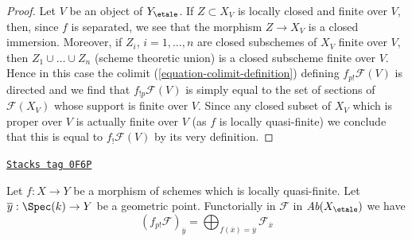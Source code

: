 \begin{proof}
Let $V$ be an object of $Y_\etale$. If $Z \subset X_V$ is locally closed
and finite over $V$, then, since $f$ is separated, we see that
the morphism $Z \to X_V$ is a closed immersion. Moreover, if
$Z_i$, $i = 1, \ldots, n$ are closed subschemes of $X_V$ finite
over $V$, then $Z_1 \cup \ldots \cup Z_n$ (scheme theoretic union)
is a closed subscheme finite over $V$. Hence in this case the colimit
(\ref{equation-colimit-definition}) defining $f_{p!}\mathcal{F}(V)$
is directed and we find that $f_{!p}\mathcal{F}(V)$ is simply equal
to the set of sections of $\mathcal{F}(X_V)$ whose support is finite over $V$.
Since any closed subset of $X_V$ which is proper over $V$ is
actually finite over $V$ (as $f$ is locally quasi-finite)
we conclude that this is equal to $f_!\mathcal{F}(V)$
by its very definition.
\end{proof}

\begin{lemma}
\label{more-etale-lemma-finite-support-stalk}
\href{https://stacks.math.columbia.edu/tag/0F6P}{\texttt{Stacks tag 0F6P}}

Let $f : X \to Y$ be a morphism of schemes which is locally quasi-finite.
Let $\overline{y} : \Spec(k) \to Y$ be a geometric point.
Functorially in $\mathcal{F}$ in $\textit{Ab}(X_\etale)$ we have
$$
(f_{p!}\mathcal{F})_{\overline{y}} =
\bigoplus\nolimits_{f(\overline{x}) = \overline{y}} \mathcal{F}_{\overline{x}}
$$
\end{lemma}

